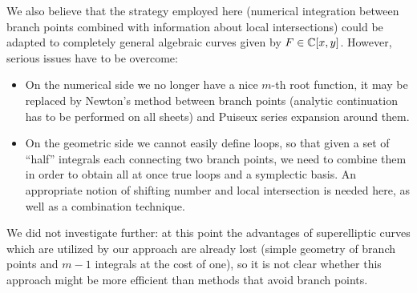 \documentclass[main.tex]{subfiles}
\begin{document}
  \medskip
  
  We also believe that the strategy employed here (numerical integration between
  branch points combined with information about local intersections) could
  be adapted to completely general algebraic curves given by $F \in \mathbb{C}[x,y]$.
  However, serious issues have to be overcome:
  \begin{itemize}
      \item On the numerical side we no longer have a nice $m$-th root function, it may be replaced by
          Newton's method between branch points (analytic continuation has to be performed on all sheets) and
          Puiseux series expansion around them.
      \item On the geometric side we cannot easily define loops, so that given a set
          of ``half'' integrals each connecting two branch points, we need to combine them in order
          to obtain all at once true loops and a symplectic basis.
          An appropriate notion of shifting number and local intersection is needed here,
          as well as a combination technique.
  \end{itemize}
  We did not investigate further: at this point the advantages
  of superelliptic curves which are utilized by our approach are already lost
 (simple geometry of branch points and $m-1$ integrals at the cost of one), 
  so it is
  not clear whether this approach might be more efficient than
  methods that avoid branch points.

  \biblio
  
\end{document}
